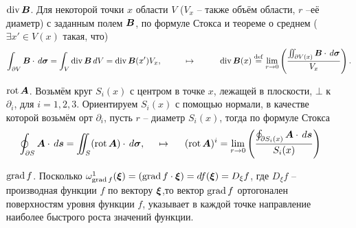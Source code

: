 \begin{itemize}
    \item[$\mathop{\mathrm{div}}\nolimits \mbox{\boldmath $B$}$.] 
    Для некоторой точки $x$ области $V$ ($V_x$ -- также объём области, $r$ --её диаметр) с заданным полем $\mbox{\boldmath $B$}$, по формуле Стокса и теореме о среднем ($\exists x' \in V(x) $ такая, что)
\begin{equation*}
    \int_{\partial V} \mbox{\boldmath $B$} \cdot \, d \mbox{\boldmath $\sigma$} = 
    \int_V \mathop{\mathrm{div}}\nolimits \mbox{\boldmath $B$} \, d V = \mathop{\mathrm{div}}\nolimits \mbox{\boldmath $B$}(x')V_x,
    \hspace{1cm} \mapsto \hspace{1cm} 
    \mathop{\mathrm{div}}\nolimits \mbox{\boldmath $B$}(x) \overset{\mathrm{def}}{=} 
    \lim_{r \to 0} \left(\frac{
                \iint_{\partial V(x)} \mbox{\boldmath $B$} \cdot \, d \mbox{\boldmath $\sigma$}
            }{
                V_x
            }\right).
\end{equation*}
\item[$\mathop{\mathrm{rot}}\nolimits \mbox{\boldmath $A$}$.] 
    Возьмём круг $S_i (x)$ с центром в точке $x$, лежащей в плоскости, $\bot$ к $\partial_i$, для $i = 1, 2, 3$. Ориентируем $S_i(x)$ с помощью нормали, в качестве которой возьмём орт $\partial_i$, пусть $r$ -- диаметр $S_i(x)$, тогда по формуле Стокса
    \begin{equation*}
        \oint_{\partial S} \mbox{\boldmath $A$} \cdot \, d \mbox{\boldmath $s$} = \iint_S (\mathop{\mathrm{rot}}\nolimits \mbox{\boldmath $A$}) \cdot \, d \mbox{\boldmath $\sigma$},
        \hspace{0.5cm} \mapsto \hspace{0.5cm}   
        (\mathop{\mathrm{rot}}\nolimits \mbox{\boldmath $A$})^i = 
        \lim_{r \to 0}
        \left(
            \frac{
            \oint_{\partial S_i(x)} \mbox{\boldmath $A$} \cdot \, d \mbox{\boldmath $s$}
            }{
            S_i(x)
            } 
        \right)
    \end{equation*}
\item[$\mathop{\mathrm{grad}}\nolimits f$.] Посколько $\omega^1_{\mathop{\mathrm{grad}}\nolimits f} (\mbox{\boldmath $\xi$}) = (\mathop{\mathrm{grad}}\nolimits f \cdot \mbox{\boldmath $\xi$}) = d f(\mbox{\boldmath $\xi$}) = D_{{\xi}}f$, где $D_{{\xi}}f$ -- производная функции $f$ по вектору $\mbox{\boldmath $\xi$}$,то вектор $\mathop{\mathrm{grad}}\nolimits f$ ортогонален поверхностям уровня функции $f$, указывает в каждой точке направление наиболее быстрого роста значений функции.
\end{itemize}


